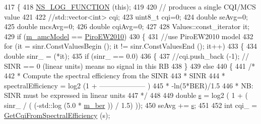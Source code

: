 \begin{DoxyCode}
417 \{
418         \hyperlink{log-macros-disabled_8h_a90b90d5bad1f39cb1b64923ea94c0761}{NS\_LOG\_FUNCTION} (\textcolor{keyword}{this});
419 
420         \textcolor{comment}{// produces a single CQI/MCS value}
421 
422         \textcolor{comment}{//std::vector<int> cqi;}
423         uint8\_t cqi=0;
424         \textcolor{keywordtype}{double} seAvg=0;
425         \textcolor{keywordtype}{double} mcsAvg=0;
426         \textcolor{keywordtype}{double} cqiAvg=0;
427 
428         Values::const\_iterator it;
429         \textcolor{keywordflow}{if} (\hyperlink{classns3_1_1MmWaveAmc_a4518d21ebad09825dd22466951c6935b}{m\_amcModel} == \hyperlink{classns3_1_1MmWaveAmc_a2805c1e6b48cb88e9cf86b062e079401aa7b0954f22ca97fa89b0d794155245d0}{PiroEW2010})
430         \{
431                 \textcolor{comment}{//use PiroEW2010 model}
432                 \textcolor{keywordflow}{for} (it = sinr.ConstValuesBegin (); it != sinr.ConstValuesEnd (); it++)
433                 \{
434                         \textcolor{keywordtype}{double} sinr\_ = (*it);
435                         \textcolor{keywordflow}{if} (sinr\_ == 0.0)
436                         \{
437                                 \textcolor{comment}{//cqi.push\_back (-1); // SINR == 0 (linear units) means no signal in this
       RB}
438                         \}
439                         \textcolor{keywordflow}{else}
440                         \{
441                                 \textcolor{comment}{/*}
442 \textcolor{comment}{                                 * Compute the spectral efficiency from the SINR}
443 \textcolor{comment}{                                 *                                        SINR}
444 \textcolor{comment}{                                 * spectralEfficiency = log2 (1 + -------------------- )}
445 \textcolor{comment}{                                 *                                    -ln(5*BER)/1.5}
446 \textcolor{comment}{                                 * NB: SINR must be expressed in linear units}
447 \textcolor{comment}{                                 */}
448 
449                                 \textcolor{keywordtype}{double} \hyperlink{generate__test__data__lte__sinr_8m_ad83eeb3a142285d1243a08c6b7026df8}{s} = log2 ( 1 + ( sinr\_ / ( (-std::log (5.0 * 
      \hyperlink{classns3_1_1MmWaveAmc_ac0e911c1ebab08ab7c52713ea5b35a15}{m\_ber} )) / 1.5) ));
450                                 seAvg += \hyperlink{generate__test__data__lte__sinr_8m_ad83eeb3a142285d1243a08c6b7026df8}{s};
451 
452                                 \textcolor{keywordtype}{int} cqi\_ = \hyperlink{classns3_1_1MmWaveAmc_acbe2e5714d389d77b25d1dfbe433a806}{GetCqiFromSpectralEfficiency} (s);

\end{DoxyCode}
